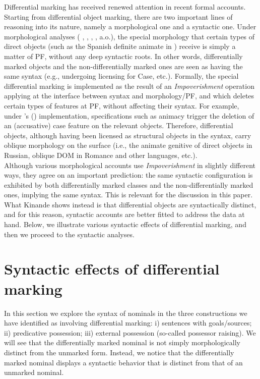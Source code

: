 \documentclass[output=paper]{langscibook}
\begin{document}
Differential marking has received renewed attention in recent formal accounts. Starting from differential object marking, there are two important lines of reasoning into its nature, namely a morphological one and a syntactic one. Under morphological analyses (\citeauthor{HalleMarantz1993} \citeyear{HalleMarantz1993}, \citeauthor{KeineMuller2008} \citeyear{KeineMuller2008}, \citeauthor{Keine2010} \citeyear{Keine2010}, \citeauthor{Glushan2010} \citeyear{Glushan2010}, a.o.), the special morphology that certain types of direct objects (such as the Spanish definite animate in ) receive is simply a matter of PF, without any deep syntactic roots. In other words, differentially marked objects and the non-differentially marked ones are seen as having the same syntax (e.g., undergoing licensing for Case, etc.). Formally, the special differential marking is implemented as the result of an \textit{Impoverishment} operation applying at the interface between syntax and morphology/PF, and which deletes certain types of features at PF, without affecting their syntax. For example, under \citeauthor{HalleMarantz1993}'s (\citeyear{HalleMarantz1993}) implementation, specifications such as animacy trigger the deletion of an (accusative) case feature on the relevant objects. Therefore, differential objects, although having been licensed as structural objects in the syntax, carry oblique morphology on the surface (i.e., the animate genitive of direct objects in Russian, oblique DOM in Romance and other languages, etc.). \\ \indent Although various morphological accounts use \textit{Impoverishment} in slightly different ways, they agree on an important prediction: the same syntactic configuration is exhibited by both differentially marked classes and the non-differentially marked ones, implying the same syntax. This is relevant for the discussion in this paper. What Kinande shows instead is that differential objects are syntactically distinct, and for this reason, syntactic accounts are better fitted to address the data at hand. Below, we illustrate various syntactic effects of differential marking, and then we proceed to the syntactic analyses. 


\section{Syntactic effects of differential marking} \label{sec:schneider:section4}\largerpage

In this section we explore the syntax of nominals in the three constructions we have identified as involving differential marking: i) sentences with goals/sources; ii) predicative possession; iii) external possession (so-called possessor raising). We will see that the differentially marked nominal is not simply morphologically distinct from the unmarked form. Instead, we notice that the differentially marked nominal displays a syntactic behavior that is distinct from that of an unmarked nominal.  
\end{document}
